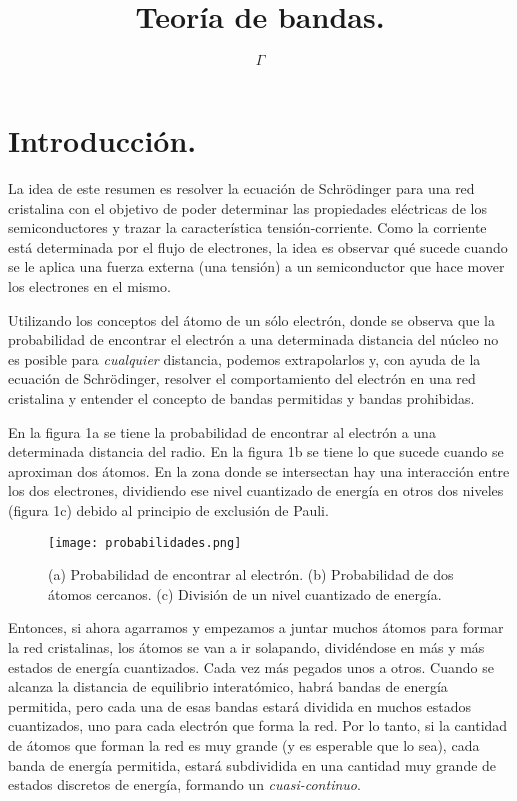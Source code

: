 \documentclass[12pt,a4paper]{article}
\begin{document}
\title{Teoría de bandas.}

\author{$\Gamma$}

\maketitle

\section{Introducción.}

La idea de este resumen es resolver la ecuación de Schrödinger para una red cristalina con el objetivo de poder determinar las propiedades eléctricas de los semiconductores y trazar la característica tensión-corriente. Como la corriente está determinada por el flujo de electrones, la idea es observar qué sucede cuando se le aplica una fuerza externa (una tensión) a un semiconductor que hace mover los electrones en el mismo.

Utilizando los conceptos del átomo de un sólo electrón, donde se observa que la probabilidad de encontrar el electrón a una determinada distancia del núcleo no es posible para \emph{cualquier} distancia, podemos extrapolarlos y, con ayuda de la ecuación de Schrödinger, resolver el comportamiento del electrón en una red cristalina y entender el concepto de bandas permitidas y bandas prohibidas.

En la figura 1a se tiene la probabilidad de encontrar al electrón a una determinada distancia del radio. En la figura 1b se tiene lo que sucede cuando se aproximan dos átomos. En la zona donde se intersectan hay una interacción entre los dos electrones, dividiendo ese nivel cuantizado de energía en otros dos niveles (figura 1c) debido al principio de exclusión de Pauli.

\begin{figure}[ht!]
\begin{center}
\texttt{[image: probabilidades.png]}
\caption{(a) Probabilidad de encontrar al electrón. (b) Probabilidad de dos átomos cercanos. (c) División de un nivel cuantizado de energía.}
\end{center}
\end{figure}

Entonces, si ahora agarramos y empezamos a juntar muchos átomos para formar la red cristalinas, los átomos se van a ir solapando, dividéndose en más y más estados de energía cuantizados. Cada vez más pegados unos a otros. Cuando se alcanza la distancia de equilibrio interatómico, habrá bandas de energía permitida, pero cada una de esas bandas estará dividida en muchos estados cuantizados, uno para cada electrón que forma la red. Por lo tanto, si la cantidad de átomos que forman la red es muy grande (y es esperable que lo sea), cada banda de energía permitida, estará subdividida en una cantidad muy grande de estados discretos de energía, formando un \emph{cuasi-continuo}.
\end{document}
